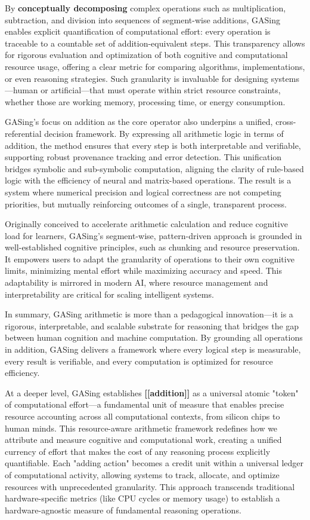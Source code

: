 By \textbf{conceptually decomposing} complex operations such as multiplication, subtraction, and division into sequences of segment-wise additions, GASing enables explicit quantification of computational effort: every operation is traceable to a countable set of addition-equivalent steps. This transparency allows for rigorous evaluation and optimization of both cognitive and computational resource usage, offering a clear metric for comparing algorithms, implementations, or even reasoning strategies. Such granularity is invaluable for designing systems—human or artificial—that must operate within strict resource constraints, whether those are working memory, processing time, or energy consumption.

GASing’s focus on addition as the core operator also underpins a unified, cross-referential decision framework. By expressing all arithmetic logic in terms of addition, the method ensures that every step is both interpretable and verifiable, supporting robust provenance tracking and error detection. This unification bridges symbolic and sub-symbolic computation, aligning the clarity of rule-based logic with the efficiency of neural and matrix-based operations. The result is a system where numerical precision and logical correctness are not competing priorities, but mutually reinforcing outcomes of a single, transparent process.

Originally conceived to accelerate arithmetic calculation and reduce cognitive load for learners, GASing’s segment-wise, pattern-driven approach is grounded in well-established cognitive principles, such as chunking and resource preservation. It empowers users to adapt the granularity of operations to their own cognitive limits, minimizing mental effort while maximizing accuracy and speed. This adaptability is mirrored in modern AI, where resource management and interpretability are critical for scaling intelligent systems.

In summary, GASing arithmetic is more than a pedagogical innovation—it is a rigorous, interpretable, and scalable substrate for reasoning that bridges the gap between human cognition and machine computation. By grounding all operations in addition, GASing delivers a framework where every logical step is measurable, every result is verifiable, and every computation is optimized for resource efficiency.

At a deeper level, GASing establishes \textbf{[[addition]]} as a universal atomic "token" of computational effort—a fundamental unit of measure that enables precise resource accounting across all computational contexts, from silicon chips to human minds. This resource-aware arithmetic framework redefines how we attribute and measure cognitive and computational work, creating a unified currency of effort that makes the cost of any reasoning process explicitly quantifiable. Each "adding action" becomes a credit unit within a universal ledger of computational activity, allowing systems to track, allocate, and optimize resources with unprecedented granularity. This approach transcends traditional hardware-specific metrics (like CPU cycles or memory usage) to establish a hardware-agnostic measure of fundamental reasoning operations.

